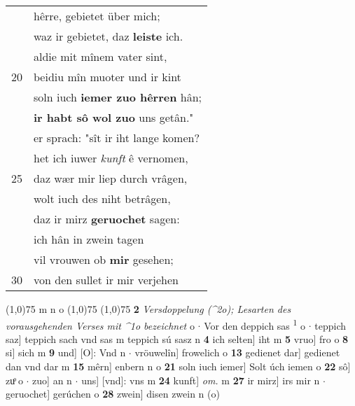 \documentclass[8pt,a4paper,notitlepage]{article}
\begin{document}
\begin{table}[ht]
\begin{minipage}[t]{0.5\linewidth}
\begin{tabular}{rl}
 & hêrre, gebietet über mich;\\ 
 & waz ir gebietet, daz \textbf{leiste} ich.\\ 
 & aldie mit mînem vater sint,\\ 
20 & beidiu mîn muoter und ir kint\\ 
 & soln iuch \textbf{iemer zuo hêrren} hân;\\ 
 & \textbf{ir habt sô wol zuo} uns getân."\\ 
 & er sprach: "sît ir iht lange komen?\\ 
 & het ich iuwer \textit{kunft} ê vernomen,\\ 
25 & daz wær mir liep durch vrâgen,\\ 
 & wolt iuch des niht betrâgen,\\ 
 & daz ir mirz \textbf{geruochet} sagen:\\ 
 & ich hân in zwein tagen\\ 
 & vil vrouwen ob \textbf{mir} gesehen;\\ 
30 & von den sullet ir mir verjehen\\ 
\end{tabular}
\scriptsize
\line(1,0){75} \newline
m n o \newline
\line(1,0){75} \newline
\newline
\line(1,0){75} \newline
\textbf{2} \textit{Versdoppelung (\textasciicircum2o); Lesarten des vorausgehenden Verses mit \textasciicircum1o bezeichnet} o   $\cdot$ Vor den deppich sas \textsuperscript{1}\hspace{-1.3mm} o  $\cdot$ teppich saz] teppich sach vnd sas m teppich sú sasz n \textbf{4} ich selten] iht m \textbf{5} vruo] fro o \textbf{8} si] sich m \textbf{9} und] [O]: Vnd n  $\cdot$ vröuwelîn] frowelich o \textbf{13} gedienet dar] gedienet dan vnd dar m \textbf{15} mêrn] enbern n o \textbf{21} soln iuch iemer] Solt úch iemen o \textbf{22} sô] zuͦ o  $\cdot$ zuo] an n  $\cdot$ uns] [vnd]: vns m \textbf{24} kunft] \textit{om.} m \textbf{27} ir mirz] irs mir n  $\cdot$ geruochet] gerúchen o \textbf{28} zwein] disen zwein n (o) \newline
\end{minipage}
\end{table}
\newpage
\end{document}
